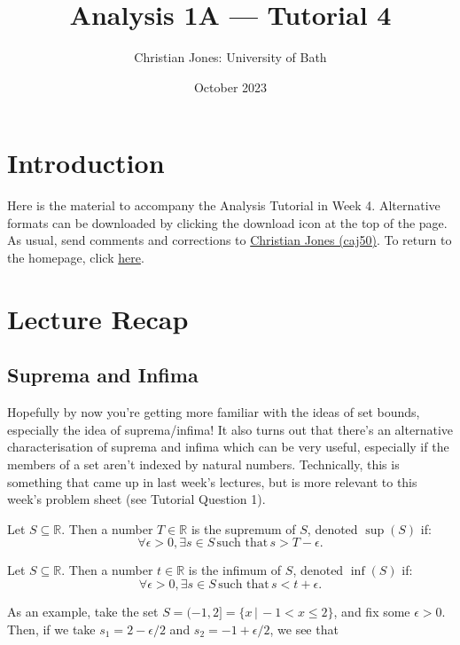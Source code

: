 \documentclass[
  12pt,
  a4paper]{extarticle}
\title{Analysis 1A --- Tutorial 4}
\author{Christian Jones: University of Bath}
\date{October 2023}
\theoremstyle{plain}
\theoremstyle{definition}
\theoremstyle{plain}
\theoremstyle{plain}
\theoremstyle{plain}
\theoremstyle{plain}
\theoremstyle{definition}
\theoremstyle{definition}
\theoremstyle{remark}
\theoremstyle{remark}
\let\BeginKnitrBlock\begin \let\EndKnitrBlock\end
\renewcommand{\;}{\,}
\begin{document}
\maketitle

{
\setcounter{tocdepth}{2}
\tableofcontents
}
\newpage
{}

\hypertarget{introduction}{%
\section*{Introduction}\label{introduction}}

Here is the material to accompany the Analysis Tutorial in Week 4. Alternative formats can be downloaded by clicking the download icon at the top of the page. As usual, send comments and corrections to \href{mailto:caj50@bath.ac.uk}{Christian Jones (caj50)}. To return to the homepage, click \href{http://caj50.github.io/tutoring.html}{here}.

\hypertarget{lecture-recap}{%
\section{Lecture Recap}\label{lecture-recap}}

\hypertarget{suprema-and-infima}{%
\subsection{Suprema and Infima}\label{suprema-and-infima}}

Hopefully by now you're getting more familiar with the ideas of set bounds, especially the idea of suprema/infima! It also turns out that there's an alternative characterisation of suprema and infima which can be very useful, especially if the members of a set aren't indexed by natural numbers. Technically, this is something that came up in last week's lectures, but is more relevant to this week's problem sheet (see Tutorial Question 1).

\BeginKnitrBlock{proposition}
{\label{prp:prop1} }Let \(S\subseteq\mathbb{R}\). Then a number \(T\in\mathbb{R}\) is the supremum of \(S\), denoted \(\sup(S)\) if: \[\forall \epsilon > 0, \exists s \in S\; \text{such that} \; s > T - \epsilon.\]
\EndKnitrBlock{proposition}

\BeginKnitrBlock{proposition}
{\label{prp:prop2} }Let \(S\subseteq\mathbb{R}\). Then a number \(t\in\mathbb{R}\) is the infimum of \(S\), denoted \(\inf(S)\) if: \[\forall \epsilon > 0, \exists s \in S\; \text{such that} \; s < t + \epsilon.\]
\EndKnitrBlock{proposition}
As an example, take the set \(S = (-1,2] = \lbrace x \, \lvert\, -1 < x \leq 2\rbrace\), and fix some \(\epsilon > 0\). Then, if we take \(s_1 = 2 - \epsilon/2\) and \(s_2 = -1 + \epsilon/2\), we see that
\end{document}

